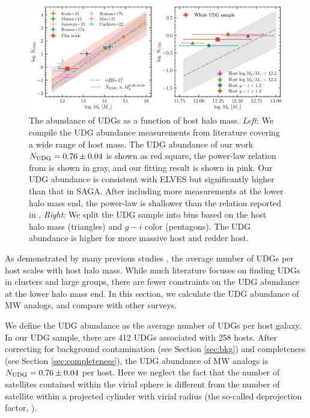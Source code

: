 \documentclass[twocolumn,astrosymb,twocolappendix]{aastex631}
\begin{document}
\begin{CJK*}{UTF8}{gbsn}
\begin{figure}
	\vbox{ 
		\centering
		\includegraphics[width=1\linewidth]{N_UDG_host_mass.pdf}
	}
    \caption{The abundance of UDGs as a function of host halo mass. \textit{Left}: We compile the UDG abundance measurements from literature covering a wide range of host mass. The UDG abundance of our work $N_{\rm UDG} = 0.76\pm 0.04$ is shown as red square, the power-law relation from \citet{vdBurg2017} is shown in gray, and our fitting result is shown in pink. Our UDG abundance is consistent with ELVES but significantly higher than that in SAGA. After including more measurements at the lower halo mass end, the power-law is shallower than the relation reported in \citet{vdBurg2017}. \textit{Right}: We split the UDG sample into bins based on the host halo mass (triangles) and $g-i$ color (pentagons). The UDG abundance is higher for more massive host and redder host. }
    \label{fig:n_udg}
\end{figure}

As demonstrated by many previous studies \citep[e.g.,][]{vdBurg2016,vdBurg2017}, the average number of UDGs per host scales with host halo mass. While much literature focuses on finding UDGs in clusters and large groups, there are fewer constraints on the UDG abundance at the lower halo mass end. In this section, we calculate the UDG abundance of MW analogs, and compare with other surveys.

We define the UDG abundance as the average number of UDGs per host galaxy. In our UDG sample, there are 412 UDGs associated with 258 hosts. After correcting for background contamination (see Section \ref{sec:bkg}) and completeness (see Section \ref{sec:completeness}), the UDG abundance of MW analogs is $N_{\rm UDG} = 0.76\pm 0.04$ per host. Here we neglect the fact that the number of satellites contained within the virial sphere is different from the number of satellite within a projected cylinder with virial radius (the so-called deprojection factor, \citealt{vdBurg2017}).


\end{CJK*}
\end{document}
